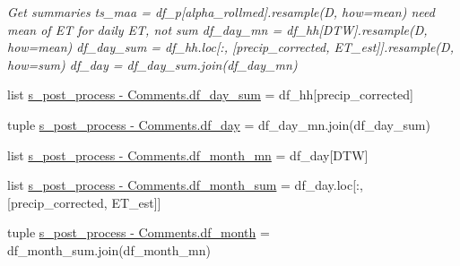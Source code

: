 \begin{DoxyCompactItemize}
\begin{DoxyCompactList}\small\item\em Get summaries ts\+\_\+maa = df\+\_\+p\mbox{[}\textquotesingle{}alpha\+\_\+rollmed\textquotesingle{}\mbox{]}.resample(\textquotesingle{}D\textquotesingle{}, how=\textquotesingle{}mean\textquotesingle{}) need mean of E\+T for daily E\+T, not sum df\+\_\+day\+\_\+mn = df\+\_\+hh\mbox{[}\textquotesingle{}D\+T\+W\textquotesingle{}\mbox{]}.resample(\textquotesingle{}D\textquotesingle{}, how=\textquotesingle{}mean\textquotesingle{}) df\+\_\+day\+\_\+sum = df\+\_\+hh.\+loc\mbox{[}\+:, \mbox{[}\textquotesingle{}precip\+\_\+corrected\textquotesingle{}, \textquotesingle{}E\+T\+\_\+est\textquotesingle{}\mbox{]}\mbox{]}.resample(\textquotesingle{}D\textquotesingle{}, how=\textquotesingle{}sum\textquotesingle{}) df\+\_\+day = df\+\_\+day\+\_\+sum.\+join(df\+\_\+day\+\_\+mn) \end{DoxyCompactList}\item 
list \hyperlink{namespaces__post__process_01-_01_comments_a171d51f6d9fd3e0e8100d8a932b24f3d}{s\+\_\+post\+\_\+process -\/ Comments.\+df\+\_\+day\+\_\+sum} = df\+\_\+hh\mbox{[}\textquotesingle{}precip\+\_\+corrected\textquotesingle{}\mbox{]}
\item 
tuple \hyperlink{namespaces__post__process_01-_01_comments_a6b0f3b1ea6c915417d9095c71f6a6d37}{s\+\_\+post\+\_\+process -\/ Comments.\+df\+\_\+day} = df\+\_\+day\+\_\+mn.\+join(df\+\_\+day\+\_\+sum)
\item 
list \hyperlink{namespaces__post__process_01-_01_comments_a7e79dd26fcae372621057462f779d8cc}{s\+\_\+post\+\_\+process -\/ Comments.\+df\+\_\+month\+\_\+mn} = df\+\_\+day\mbox{[}\textquotesingle{}D\+T\+W\textquotesingle{}\mbox{]}
\item 
list \hyperlink{namespaces__post__process_01-_01_comments_a6b3103e90669e297e65f84e9223e0d02}{s\+\_\+post\+\_\+process -\/ Comments.\+df\+\_\+month\+\_\+sum} = df\+\_\+day.\+loc\mbox{[}\+:, \mbox{[}\textquotesingle{}precip\+\_\+corrected\textquotesingle{}, \textquotesingle{}E\+T\+\_\+est\textquotesingle{}\mbox{]}\mbox{]}
\item 
tuple \hyperlink{namespaces__post__process_01-_01_comments_a0c297e8e03d58f418d0c814d57970854}{s\+\_\+post\+\_\+process -\/ Comments.\+df\+\_\+month} = df\+\_\+month\+\_\+sum.\+join(df\+\_\+month\+\_\+mn)
\end{DoxyCompactItemize}
